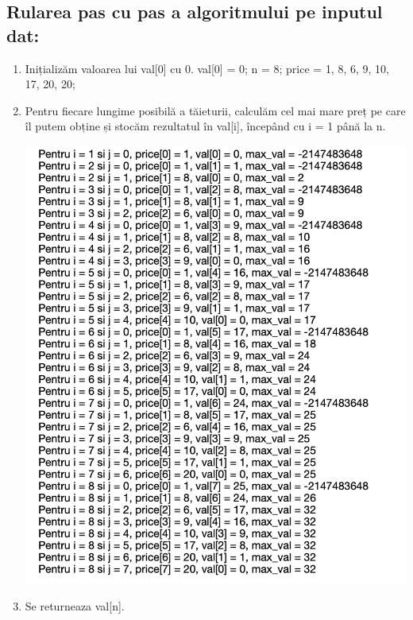 \documentclass[runningheads]{llncs}
\begin{document}
\subsection{Rularea pas cu pas a algoritmului pe inputul dat:}
 \begin{enumerate}
     \item Inițializăm valoarea lui val[0] cu 0.\newline
     val[0] = 0;\newline
n = 8;\newline
price = {1, 8, 6, 9, 10, 17, 20, 20};\newline

\item Pentru fiecare lungime posibilă a tăieturii, calculăm cel mai mare preț pe care îl putem obține și stocăm rezultatul în val[i], începând cu i = 1 până la n.\newline
\begin{center}
    \includegraphics[scale=0.5]{1.png}
\end{center}
\item Se returneaza val[n].
 \end{enumerate}
 
\end{document}
